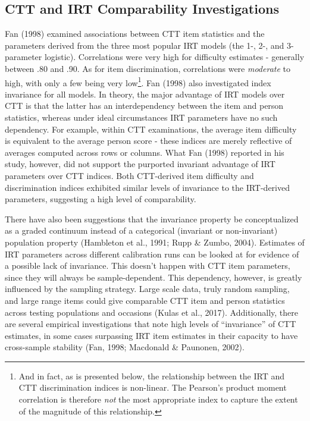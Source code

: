 \documentclass[
  man]{apa6}
\begin{document}
\hypertarget{ctt-and-irt-comparability-investigations}{%
\subsection{CTT and IRT Comparability Investigations}\label{ctt-and-irt-comparability-investigations}}

Fan (1998) examined associations between CTT item statistics and the parameters derived from the three most popular IRT models (the 1-, 2-, and 3-parameter logistic). Correlations were very high for difficulty estimates - generally between .80 and .90. As for item discrimination, correlations were \emph{moderate} to high, with only a few being very low\footnote{And in fact, as is presented below, the relationship between the IRT and CTT discrimination indices is non-linear. The Pearson's product moment correlation is therefore \emph{not} the most appropriate index to capture the extent of the magnitude of this relationship.}. Fan (1998) also investigated index invariance for all models. In theory, the major advantage of IRT models over CTT is that the latter has an interdependency between the item and person statistics, whereas under ideal circumstances IRT parameters have no such dependency. For example, within CTT examinations, the average item difficulty is equivalent to the average person score - these indices are merely reflective of averages computed across rows or columns. What Fan (1998) reported in his study, however, did not support the purported invariant advantage of IRT parameters over CTT indices. Both CTT-derived item difficulty and discrimination indices exhibited similar levels of invariance to the IRT-derived parameters, suggesting a high level of comparability.

There have also been suggestions that the invariance property be conceptualized as a graded continuum instead of a categorical (invariant or non-invariant) population property (Hambleton et al., 1991; Rupp \& Zumbo, 2004). Estimates of IRT parameters across different calibration runs can be looked at for evidence of a possible lack of invariance. This doesn't happen with CTT item parameters, since they will always be sample-dependent. This dependency, however, is greatly influenced by the sampling strategy. Large scale data, truly random sampling, and large range items could give comparable CTT item and person statistics across testing populations and occasions (Kulas et al., 2017). Additionally, there are several empirical investigations that note high levels of ``invariance'' of CTT estimates, in some cases surpassing IRT item estimates in their capacity to have cross-sample stability (Fan, 1998; Macdonald \& Paunonen, 2002).
\end{document}
